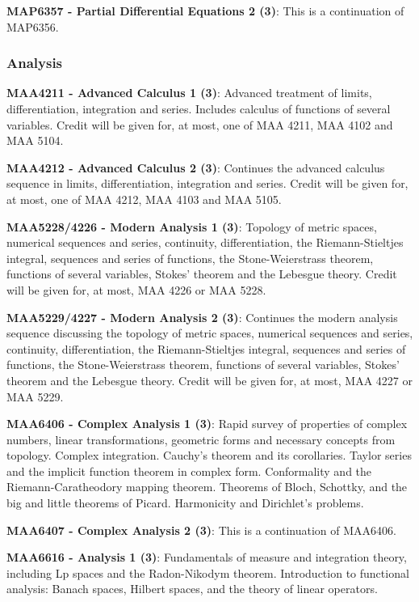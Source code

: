 \documentclass[11pt]{article}
\begin{document}
\textbf{MAP6357 - Partial Differential Equations 2 (3)}: This is a continuation of MAP6356.

\subsubsection{\colorbox{anal}{Analysis}}

\textbf{MAA4211 - Advanced Calculus 1 (3)}: Advanced treatment of limits, differentiation, integration and series. Includes calculus of functions of several variables. Credit will be given for, at most, one of MAA 4211, MAA 4102 and MAA 5104.

\textbf{MAA4212 - Advanced Calculus 2 (3)}: Continues the advanced calculus sequence in limits, differentiation, integration and series. Credit will be given for, at most, one of MAA 4212, MAA 4103 and MAA 5105.

\textbf{MAA5228/4226 - Modern Analysis 1 (3)}: Topology of metric spaces, numerical sequences and series, continuity, differentiation, the Riemann-Stieltjes integral, sequences and series of functions, the Stone-Weierstrass theorem, functions of several variables, Stokes' theorem and the Lebesgue theory. Credit will be given for, at most, MAA 4226 or MAA 5228.

\textbf{MAA5229/4227 - Modern Analysis 2 (3)}: Continues the modern analysis sequence discussing the topology of metric spaces, numerical sequences and series, continuity, differentiation, the Riemann-Stieltjes integral, sequences and series of functions, the Stone-Weierstrass theorem, functions of several variables, Stokes' theorem and the Lebesgue theory. Credit will be given for, at most, MAA 4227 or MAA 5229.

\textbf{MAA6406 - Complex Analysis 1 (3)}: Rapid survey of properties of complex numbers, linear transformations, geometric forms and necessary concepts from topology. Complex integration. Cauchy's theorem and its corollaries. Taylor series and the implicit function theorem in complex form. Conformality and the Riemann-Caratheodory mapping theorem. Theorems of Bloch, Schottky, and the big and little theorems of Picard. Harmonicity and Dirichlet's problems.

\textbf{MAA6407 - Complex Analysis 2 (3)}: This is a continuation of MAA6406.

\textbf{MAA6616 - Analysis 1 (3)}: Fundamentals of measure and integration theory, including Lp spaces and the Radon-Nikodym theorem. Introduction to functional analysis: Banach spaces, Hilbert spaces, and the theory of linear operators.
\end{document}
